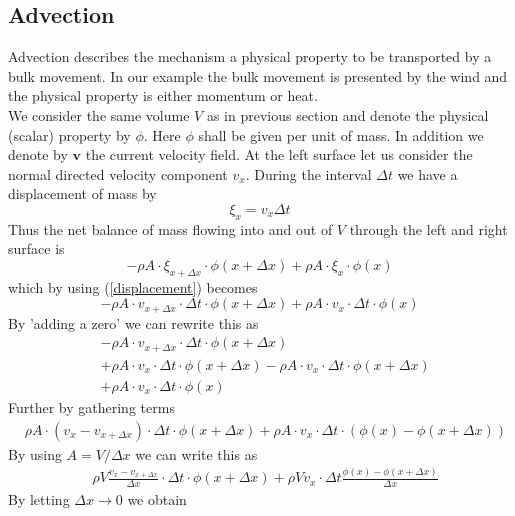 \documentclass[]{article}
\begin{document}
\subsection{Advection}
Advection describes the mechanism a physical property to be transported by a bulk movement. In our example the bulk movement is presented by the wind and the physical property is either momentum or heat.\\
We consider the same volume $V$ as in previous section and denote the physical (scalar) property by $\phi$. Here $\phi$ shall be given per unit of mass. In addition we denote by $\textbf{v}$ the current velocity field. At the left surface let us consider the normal directed velocity component $v_x$. During the interval $\Delta t$ we have a displacement of mass by
\begin{equation} \label{displacement}
\xi_{x}=v_x\Delta t
\end{equation} 
Thus the net balance of mass flowing into and out of $V$ through the left and right surface is
\begin{equation} \label{net_flow}
-\rho A\cdot\xi_{x+\Delta x} \cdot \phi(x+\Delta x)+\rho A\cdot\xi_{x} \cdot \phi(x)
\end{equation}
which by using (\ref{displacement}) becomes
\begin{equation*}
-\rho A\cdot  v_{x+\Delta x}\cdot\Delta t \cdot \phi(x+\Delta x)+\rho A\cdot  v_{x}\cdot\Delta t \cdot \phi(x)
\end{equation*}
By 'adding a zero' we can rewrite this as
\begin{align*}
&-\rho A\cdot v_{x+\Delta x}\cdot\Delta t \cdot \phi(x+\Delta x) \\ &+
\rho A\cdot v_{x}\cdot\Delta t \cdot \phi(x+\Delta x) -
\rho A\cdot v_{x}\cdot\Delta t \cdot \phi(x+\Delta x) \\ &+
\rho A\cdot v_{x}\cdot\Delta t \cdot \phi(x)
\end{align*}
Further by gathering terms
\begin{align*}
&\rho A\cdot (v_{x}-v_{x+\Delta x})\cdot\Delta t \cdot \phi(x+\Delta x) +
\rho A\cdot v_{x}\cdot\Delta t \cdot (\phi(x)-\phi(x+\Delta x))
\end{align*}
By using $A=V/\Delta x$ we can write this as
\begin{align*}
&\rho V \frac{v_{x}-v_{x+\Delta x}}{\Delta x}\cdot\Delta t \cdot \phi(x+\Delta x) +
\rho V v_{x}\cdot\Delta t\frac{\phi(x)-\phi(x+\Delta x)}{\Delta x}
\end{align*}
By letting $\Delta x\rightarrow 0$ we obtain
\end{document}
